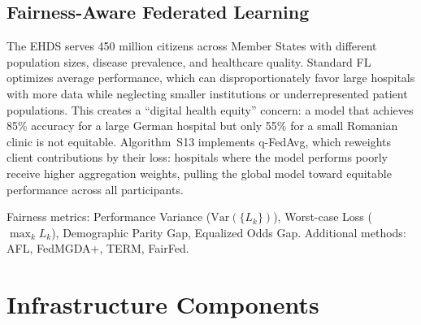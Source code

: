 \documentclass[conference,a4paper]{IEEEtran}
\begin{document}
\subsection{Fairness-Aware Federated Learning}

The EHDS serves 450 million citizens across Member States with different population sizes, disease prevalence, and healthcare quality. Standard FL optimizes average performance, which can disproportionately favor large hospitals with more data while neglecting smaller institutions or underrepresented patient populations. This creates a ``digital health equity'' concern: a model that achieves 85\% accuracy for a large German hospital but only 55\% for a small Romanian clinic is not equitable. Algorithm~S13 implements q-FedAvg, which reweights client contributions by their loss: hospitals where the model performs poorly receive higher aggregation weights, pulling the global model toward equitable performance across all participants.

\begin{figure}[htbp]
\centering
{}
\end{figure}

Fairness metrics: Performance Variance ($\text{Var}(\{L_k\})$), Worst-case Loss ($\max_k L_k$), Demographic Parity Gap, Equalized Odds Gap. Additional methods: AFL, FedMGDA+, TERM, FairFed.

\section{Infrastructure Components}
\label{sec:infrastructure}
\end{document}
